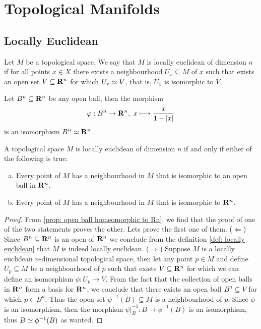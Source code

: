 \section{Topological Manifolds}

\subsection{Locally Euclidean}

\begin{definition}\label{def: locally euclidean}
    Let \(M\) be a topological space. We say that \(M \) is locally euclidean of
    dimension \(n\) if for all points \(x \in X\) there exists a neighbourhood
    \(U_x \subseteq M\) of \(x\) such that exists an open set \(V \subseteq
    \mathbf{R}^n\) for which \(U_x \simeq V\), that is, \(U_x\) is isomorphic to
    \(V\).
\end{definition}

\begin{proposition}\label{prop: open ball homeomorphic to Rn}
    Let \(B^n \subseteq \mathbf{R}^n\) be any open ball, then the morphism
    \[
        \varphi: B^n \to \mathbf{R}^n,\ x \longmapsto \frac{x}{1 - |x|}
    \]
    is an isomorphism \(B^n \simeq \mathbf{R}^n\).
\end{proposition}

\begin{lemma}\label{lem:locally-euclidean-equivalences}
    A topological space \(M\) is locally euclidean of dimension \(n\) if and only
    if either of the following is true:
    \begin{enumerate}[(a)]
        \item Every point of \(M\) has a neighbourhood in \(M\) that is isomorphic
              to an open ball in \(\mathbf{R}^n\).
        \item Every point of \(M\) has a neighbourhood in \(M\) that is isomorphic
              to \(\mathbf{R}^n\).
    \end{enumerate}
\end{lemma}

\begin{proof}
    From \cref{prop: open ball homeomorphic to Rn}, we find that the proof of one
    of the two statements proves the other. Lets prove the first one of them.
    (\(\Leftarrow\)) Since \(B^n \subseteq \mathbf{R}^n\) is an open of
    \(\mathbf{R}^n\) we conclude from the definition \cref{def: locally euclidean}
    that \(M\) is indeed locally euclidean.
    (\(\Rightarrow\)) Suppose \(M\) is a locally euclidean \(n\)-dimensional
    topological space, then let any point \(p \in M\) and define \(U_p \subseteq
    M\) be a neighbourhood of \(p\) such that exists \(V \subseteq \mathbf{R}^n\)
    for which we can define an isomorphism \(\phi : U_p \to V\). From the fact
    that the collection of open balls in \(\mathbf{R}^n\) form a basis for
    \(\mathbf{R}^n\), we conclude that there exists an open ball \(B^n \subseteq
    V\) for which \(p \in B^n\). Thus the open set \(\psi^{-1}(B) \subseteq M\) is
    a neighbourhood of \(p\). Since \(\phi\) is an isomorphism, then the
    morphism \(\psi|_B^{-1} : B \to \phi^{-1}(B)\) is an isomorphism, thus \(B
    \simeq \phi^{-1}(B)\) as wanted.
\end{proof}

